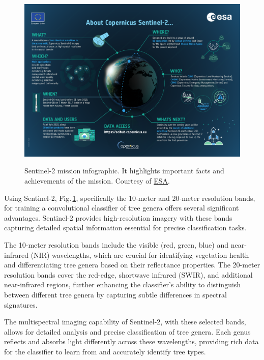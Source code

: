 \begin{figure}[ht]
    \centering
    \href{https://sentinels.copernicus.eu/documents/247904/4180891/Sentinel-2-infographic.pdf}
    {\includegraphics[width=0.9\linewidth]{figures/figures_sentinel/Sentinel-2-infographic.pdf}}
    \caption{
        Sentinel-2 mission infographic. It highlights important facts and 
        achievements of the mission. 
        Courtesy of \href{https://sentinels.copernicus.eu/web/sentinel/missions/sentinel-2}{ESA}.
    }
    \label{fig:sentinel2_info}
\end{figure}

Using Sentinel-2, Fig.\,\ref{fig:sentinel2_info}, specifically the 10-meter and 20-meter resolution bands, 
for training a convolutional classifier of tree genera offers several significant advantages. 
Sentinel-2 provides high-resolution imagery with these bands capturing detailed spatial 
information essential for precise classification tasks.

The 10-meter resolution bands include the visible (red, green, blue) and 
near-infrared (NIR) wavelengths, which are crucial for identifying vegetation 
health and differentiating tree genera based on their reflectance properties. 
The 20-meter resolution bands cover the red-edge, shortwave infrared (SWIR), 
and additional near-infrared regions, further enhancing the classifier's ability
to distinguish between different tree genera by capturing subtle differences in spectral signatures.

The multispectral imaging capability of Sentinel-2, with these selected bands, 
allows for detailed analysis and precise classification of tree genera. 
Each genus reflects and absorbs light differently across these wavelengths, 
providing rich data for the classifier to learn from and accurately identify tree types.

